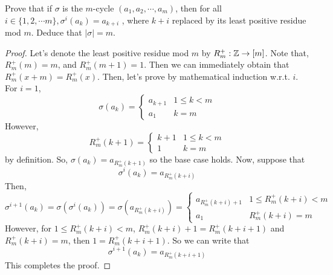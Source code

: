 \documentclass[12pt, a4paper, openany, twoside]{book}
\theoremstyle{definition}
\theoremstyle{remark}
\theoremstyle{plain}
\numberwithin{equation}{section}
\begin{document}
\begin{tcolorbox}[colback=yellow!10!white,colframe=violet!75!white,title=Exercise 10,breakable]

Prove that if $\sigma$ is the $m$-cycle $(a_1, a_2, \cdots, a_m)$, then for all $i \in \{1, 2, \cdots m\}, \sigma^i(a_k) = a_{k+i}$
, where $k + i$ replaced by its least positive residue mod $m$. Deduce that $|\sigma| = m$. 

\begin{proof}
    
Let's denote the least positive residue mod $m$ by $R^+_m : {\mathbb {Z}} \rightarrow [m]$. Note that, 
$R^+_m(m) = m$, and $R^+_m(m + 1) = 1$. Then we can immediately obtain that $R^+_m(x + m) = R^+_m(x)$. 
Then, let's prove by mathematical induction w.r.t. $i$. For $i = 1$, 
\[\sigma(a_k) = \begin{cases}
    a_{k+1} & 1 \leq k < m \\
    a_1 & k = m 
\end{cases}\]
However, \[R^+_m(k + 1) = \begin{cases}
    k + 1 & 1 \leq k < m \\
    1 & k = m 
\end{cases} \] 
by definition. 
So, $\sigma(a_k) = a_{R^+_m(k+1)}$ so the base case holds. Now, suppose that 
\[\sigma^i(a_k) = a_{R^+_m(k + i)}\]
Then, 
\[\sigma^{i+1}(a_k) = \sigma (\sigma^i(a_k)) = \sigma(a_{R^+_m(k + i)}) = \begin{cases}
    a_{R^+_m(k + i) + 1} & 1 \leq R^+_m(k + i) < m \\
    a_1 & R^+_m(k + i) = m
\end{cases}\]
However, for $1 \leq R^+_m(k + i) < m$, $R^+_m(k + i) + 1 = R^+_m(k + i + 1)$ and 
$R^+_m(k + i) = m$, then $ 1 = R^+_m(k + i + 1)$. So we can write that 
\[\sigma^{i+1}(a_k) = a_{R^+_m(k + i + 1)}\]
This completes the proof.
\end{proof}

\end{tcolorbox}
\end{document}
